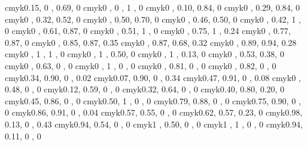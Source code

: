 \definecolor{greenyellow}   {cmyk}{0.15, 0   , 0.69, 0   }
\definecolor{yellow}        {cmyk}{0   , 0   , 1   , 0   }
\definecolor{goldenrod}     {cmyk}{0   , 0.10, 0.84, 0   }
\definecolor{dandelion}     {cmyk}{0   , 0.29, 0.84, 0   }
\definecolor{apricot}       {cmyk}{0   , 0.32, 0.52, 0   }
\definecolor{peach}         {cmyk}{0   , 0.50, 0.70, 0   }
\definecolor{melon}         {cmyk}{0   , 0.46, 0.50, 0   }
\definecolor{yelloworange}  {cmyk}{0   , 0.42, 1   , 0   }
\definecolor{orange}        {cmyk}{0   , 0.61, 0.87, 0   }
\definecolor{burntorange}   {cmyk}{0   , 0.51, 1   , 0   }
\definecolor{bittersweet}   {cmyk}{0   , 0.75, 1   , 0.24}
\definecolor{redorange}     {cmyk}{0   , 0.77, 0.87, 0   }
\definecolor{mahogany}      {cmyk}{0   , 0.85, 0.87, 0.35}
\definecolor{maroon}        {cmyk}{0   , 0.87, 0.68, 0.32}
\definecolor{brickred}      {cmyk}{0   , 0.89, 0.94, 0.28}
\definecolor{red}            {cmyk}{0   , 1   , 1   , 0   }
\definecolor{orangered}      {cmyk}{0   , 1   , 0.50, 0   }
\definecolor{rubinered}      {cmyk}{0   , 1   , 0.13, 0   }
\definecolor{salmon}        {cmyk}{0   , 0.53, 0.38, 0   }
\definecolor{carnationpink} {cmyk}{0   , 0.63, 0   , 0   }
\definecolor{magenta}        {cmyk}{0   , 1   , 0   , 0   }
\definecolor{violetred}      {cmyk}{0   , 0.81, 0   , 0   }
\definecolor{rhodamine}      {cmyk}{0   , 0.82, 0   , 0   }
\definecolor{mulberry}      {cmyk}{0.34, 0.90, 0   , 0.02}
\definecolor{redviolet}      {cmyk}{0.07, 0.90, 0   , 0.34}
\definecolor{fuchsia}        {cmyk}{0.47, 0.91, 0   , 0.08}
\definecolor{lavender}      {cmyk}{0   , 0.48, 0   , 0   }
\definecolor{thistle}        {cmyk}{0.12, 0.59, 0   , 0   }
\definecolor{orchid}        {cmyk}{0.32, 0.64, 0   , 0   }
\definecolor{darkorchid}    {cmyk}{0.40, 0.80, 0.20, 0   }
\definecolor{purple}        {cmyk}{0.45, 0.86, 0   , 0   }
\definecolor{plum}          {cmyk}{0.50, 1   , 0   , 0   }
\definecolor{violet}        {cmyk}{0.79, 0.88, 0   , 0   }
\definecolor{royalpurple}    {cmyk}{0.75, 0.90, 0   , 0   }
\definecolor{blueviolet}    {cmyk}{0.86, 0.91, 0   , 0.04}
\definecolor{periwinkle}    {cmyk}{0.57, 0.55, 0   , 0   }
\definecolor{cadetblue}      {cmyk}{0.62, 0.57, 0.23, 0   }
\definecolor{midnightblue}  {cmyk}{0.98, 0.13, 0   , 0.43}
\definecolor{navyblue}      {cmyk}{0.94, 0.54, 0   , 0   }
\definecolor{royalblue}      {cmyk}{1   , 0.50, 0   , 0   }
\definecolor{blue}          {cmyk}{1   , 1   , 0   , 0   }
\definecolor{cerulean}      {cmyk}{0.94, 0.11, 0   , 0   }
